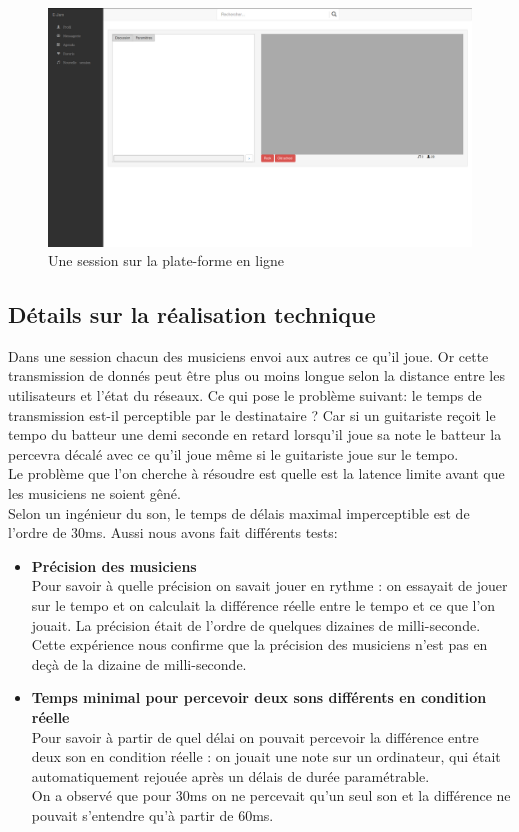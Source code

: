 \documentclass[a4,12pt]{article}
\begin{document}
\begin{figure}[!ht]
    \center
    \includegraphics[width=15cm]{ceca_site_session.png}
    \caption{Une session sur la plate-forme en ligne}
    \label{ceca_site_session}
\end{figure}

\subsection{Détails sur la réalisation technique}

Dans une session chacun des musiciens envoi aux autres ce qu’il joue. Or cette transmission de donnés peut être plus ou moins longue selon la distance entre les utilisateurs et l’état du réseaux. Ce qui pose le problème suivant: le temps de transmission est-il perceptible par le destinataire ? Car si un guitariste reçoit le tempo du batteur une demi seconde en retard lorsqu’il joue sa note le batteur la percevra décalé avec ce qu’il joue même si le guitariste joue sur le tempo.\\
Le problème que l’on cherche à résoudre est quelle est la latence limite avant que les musiciens ne soient gêné.\\
Selon un ingénieur du son, le temps de délais maximal imperceptible est de l’ordre de 30ms. Aussi nous avons fait différents tests:
\begin{itemize}
    \item \textbf{Précision des musiciens}\\
    Pour savoir à quelle précision on savait jouer en rythme : on essayait de jouer sur le tempo et on calculait la différence réelle entre le tempo et ce que l’on jouait. La précision était de l’ordre de quelques dizaines de milli-seconde.\\
    Cette expérience nous confirme que la précision des musiciens n’est pas en deçà de la dizaine de milli-seconde.
    \item \textbf{Temps minimal pour percevoir deux sons différents en condition réelle}\\
    Pour savoir à partir de quel délai on pouvait percevoir la différence entre deux son en condition réelle : on jouait une note sur un ordinateur, qui était automatiquement rejouée après un délais de durée paramétrable.
    \\
    On a observé que pour 30ms on ne percevait qu’un seul son et la différence ne pouvait s’entendre qu’à partir de 60ms.
\end{itemize}
\newpage
\end{document}
